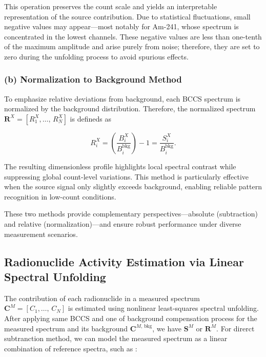 \documentclass[10pt]{wlscirep}
\begin{document}
This operation preserves the count scale and yields an interpretable representation of the source contribution. Due to statistical fluctuations, small negative values may appear—most notably for Am-241, whose spectrum is concentrated in the lowest channels. These negative values are less than one-tenth of the maximum amplitude and arise purely from noise; therefore, they are set to zero during the unfolding process to avoid spurious effects.


\subsubsection*{(b) Normalization to Background Method} 

To emphasize relative deviations from background, each BCCS spectrum is normalized by the background distribution. Therefore, the normalized spectrum $\mathbf{R}^X=[R^X_1,\ldots,\,R^X_N]$ is defineds as

\begin{equation}
R^X_i = \left(\dfrac{B^X_i}{B^{\textrm{bkg}}_i}\right) -1=\dfrac{S^X_i}{B_i^{\text{bkg}}}.\label{eq:NB}
\end{equation}

The resulting dimensionless profile highlights local spectral contrast while suppressing global count-level variations. This method is particularly effective when the source signal only slightly exceeds background, enabling reliable pattern recognition in low-count conditions.

These two methods provide complementary perspectives—absolute (subtraction) and relative (normalization)—and ensure robust performance under diverse measurement scenarios.

\subsection*{Radionuclide Activity Estimation via Linear Spectral Unfolding}

The contribution of each radionuclide in a measured spectrum $\mathbf{C}^M=[C_1,\ldots,\,C_N]$ is estimated using nonlinear least-squares spectral unfolding. After applying same BCCS and one of background compensation process for the measured spectrum and its background $\mathbf{C}^{M,\,\text{bkg}}$, we have $\mathbf{S}^M$ or $\mathbf{R}^M$. For direrct subtranction method, we can model the measured spectrum as a linear combination of reference spectra, such as :
\end{document}
